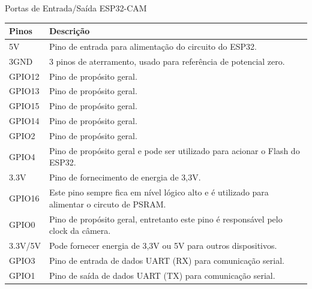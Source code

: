 \begin{tabframed}[htb]
    \caption{Portas de Entrada/Saída ESP32-CAM}
    \label{quad:quadro1}
    \begin{tabular}{|l|l|}
        \hline
        \textbf{Pinos} & \textbf{Descrição}                                                                          \\ \hline
        5V             & Pino de entrada para alimentação do circuito do ESP32.                                      \\ \hline
        3GND           & 3 pinos de aterramento, usado para referência de potencial zero.                          \\ \hline
        GPIO12         & Pino de propósito geral.                                                                    \\ \hline
        GPIO13         & Pino de propósito geral.                                                                    \\ \hline
        GPIO15         & Pino de propósito geral.                                                                    \\ \hline
        GPIO14         & Pino de propósito geral.                                                                    \\ \hline
        GPIO2          & Pino de propósito geral.                                                                    \\ \hline
        GPIO4          & Pino de propósito geral e pode ser utilizado para acionar o Flash do ESP32.                 \\ \hline
        3.3V           & Pino de fornecimento de energia de 3,3V.                                                    \\ \hline
        GPIO16         & Este pino sempre fica em nível lógico alto e é utilizado para alimentar o circuto de PSRAM. \\ \hline
        GPIO0          & Pino de propósito geral, entretanto este pino é responsável pelo clock da câmera.           \\ \hline
        3.3V/5V        & Pode fornecer energia de 3,3V ou 5V para outros dispositivos.                               \\ \hline
        GPIO3          & Pino de entrada de dados UART (RX) para comunicação serial.                                 \\ \hline
        GPIO1          & Pino de saída de dados UART (TX) para comunicação serial.                                   \\ \hline
    \end{tabular}
    \fonte{}%
\end{tabframed}

